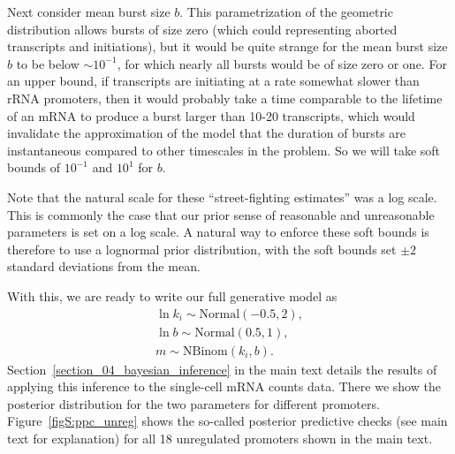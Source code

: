 Next consider mean burst size $b$. This parametrization of the geometric
distribution allows bursts of size zero (which could representing aborted
transcripts and initiations), but it would be quite strange for the mean burst
size $b$ to be below $\sim10^{-1}$, for which nearly all bursts would be of size
zero or one. For an upper bound, if transcripts are initiating at a rate
somewhat slower than rRNA promoters, then it would probably take a time
comparable to the lifetime of an mRNA to produce a burst larger than 10-20
transcripts, which would invalidate the approximation of the model that the
duration of bursts are instantaneous compared to other timescales in the
problem. So we will take soft bounds of $10^{-1}$ and $10^1$ for $b$.

Note that the natural scale for these ``street-fighting estimates'' was a log
scale. This is commonly the case that our prior sense of reasonable and
unreasonable parameters is set on a log scale. A natural way to enforce these
soft bounds is therefore to use a lognormal prior distribution, with the soft
bounds set $\pm2$ standard deviations from the mean.

With this, we are ready to write our full generative model as
\begin{equation}
\begin{split}
\ln k_i \sim \text{Normal}(-0.5, 2),
\\
\ln b \sim \text{Normal}(0.5, 1),
\\
m \sim \text{NBinom}(k_i, b).
\end{split}
\end{equation}
Section~\ref{section_04_bayesian_inference} in the main text details the
results of applying this inference to the single-cell mRNA counts data. There
we show the posterior distribution for the two parameters for different 
promoters. Figure~\ref{figS:ppc_unreg} shows the so-called posterior predictive
checks (see main text for explanation) for all 18 unregulated promoters shown
in the main text.

